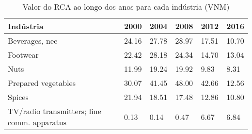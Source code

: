 \begin{table}
\centering
\caption{Valor do RCA ao longo dos anos para cada indústria (VNM)}
\label{tab:ex3-tempo-VNM}
\begin{tabular}{p{6cm}p{1.5cm}p{1.5cm}p{1.5cm}p{1.5cm}p{1.5cm}}
\toprule
                                  Indústria &  2000 &  2004 &  2008 &  2012 &  2016 \\
\midrule
                             Beverages, nec & 24.16 & 27.78 & 28.97 & 17.51 & 10.70 \\
                                   Footwear & 22.42 & 28.18 & 24.34 & 14.70 & 13.04 \\
                                       Nuts & 11.99 & 19.24 & 19.92 &  9.83 &  8.31 \\
                        Prepared vegetables & 30.07 & 41.45 & 48.00 & 42.66 & 12.56 \\
                                     Spices & 21.94 & 18.51 & 17.48 & 12.86 & 10.80 \\
TV/radio transmitters; line comm. apparatus &  0.13 &  0.14 &  0.47 &  6.67 &  6.84 \\
\bottomrule
\end{tabular}
\end{table}
